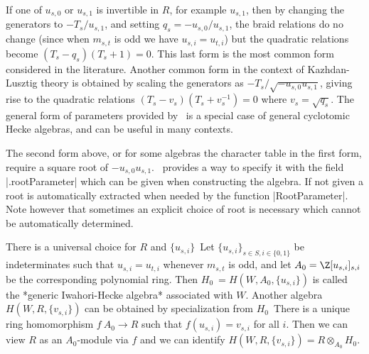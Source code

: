 If  one  of  $u_{s,0}$  or  $u_{s,1}$  is  invertible  in  $R$, for example
$u_{s,1}$,  then by changing the  generators to $-T_s/u_{s,1}$, and setting
$q_s=-u_{s,0}/u_{s,1}$,  the  braid  relations  do  no  change  (since when
$m_{s,t}$  is odd  we have  $u_{s,i}=u_{t,i}$) but  the quadratic relations
become  $(T_s-q_s)(T_s+1)=0$.  This  last  form  is  the  most  common form
considered  in  the  literature.  Another  common  form  in  the context of
Kazhdan-Lusztig   theory  is   obtained  by   scaling  the   generators  as
$-T_s/\sqrt{-u_{s,0}u_{s,1}}$,  giving  rise  to  the  quadratic  relations
$(T_s-v_s)(T_s+v_s^{-1})=0$  where  $v_s=\sqrt{q_s}$.  The  general form of
parameters  provided by  \CHEVIE\ is  a special  case of general cyclotomic
Hecke algebras, and can be useful in many contexts.

The  second form  above, or  for some  algebras the  character table in the
first form, require a square root of $-u_{s,0}u_{s,1}$. \CHEVIE\ provides a
way  to specify it with the field  |.rootParameter| which can be given when
constructing  the algebra. If  not given a  root is automatically extracted
when needed by the function |RootParameter|. Note however that sometimes an
explicit  choice  of  root  is  necessary  which  cannot  be  automatically
determined.

There   is   a   universal   choice   for   $R$  and  $\{u_{s,i}\}$\:\  Let
$\{u_{s,i}\}_{s\in    S,i\in\{0,1\}}$    be    indeterminates   such   that
$u_{s,i}=u_{t,i}$ whenever $m_{s,t}$ is odd, and let
$A_0=\Z[u_{s,i}]_{s,i}$   be  the   corresponding  polynomial   ring.  Then
$H_0\:=H(W,A_0,\{u_{s,i}\})$  is called the *generic Iwahori-Hecke algebra*
associated  with $W$. Another algebra  $H(W,R,\{v_{s,i}\})$ can be obtained
by specialization from $H_0$\:\ There is a unique ring homomorphism $f\:A_0
\rightarrow R$ such that $f(u_{s,i})=v_{s,i}$ for all $i$. Then we can view
$R$  as an $A_0$-module  via $f$ and  we can identify $H(W,R,\{v_{s,i}\})=R
\otimes_{A_0} H_0$.

